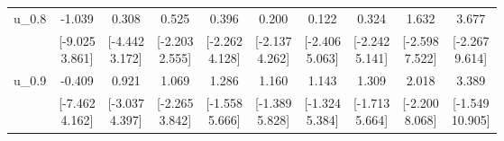 {\begin{tabular}{lccccccccc}
u\_0.8 & -1.039 & 0.308 & 0.525 & 0.396 & 0.200 & 0.122 & 0.324 & 1.632 & 3.677 \\
 & \shortstack{[-9.025\\3.861]} & \shortstack{[-4.442\\3.172]} & \shortstack{[-2.203\\2.555]} & \shortstack{[-2.262\\4.128]} & \shortstack{[-2.137\\4.262]} & \shortstack{[-2.406\\5.063]} & \shortstack{[-2.242\\5.141]} & \shortstack{[-2.598\\7.522]} & \shortstack{[-2.267\\9.614]} \\[0.25em]
u\_0.9 & -0.409 & 0.921 & 1.069 & 1.286 & 1.160 & 1.143 & 1.309 & 2.018 & 3.389 \\
 & \shortstack{[-7.462\\4.162]} & \shortstack{[-3.037\\4.397]} & \shortstack{[-2.265\\3.842]} & \shortstack{[-1.558\\5.666]} & \shortstack{[-1.389\\5.828]} & \shortstack{[-1.324\\5.384]} & \shortstack{[-1.713\\5.664]} & \shortstack{[-2.200\\8.068]} & \shortstack{[-1.549\\10.905]} \\[0.25em]
\bottomrule
\end{tabular}
}
